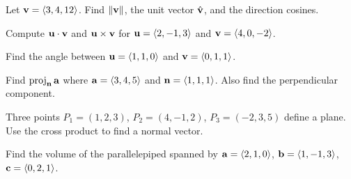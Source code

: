 \documentclass[11pt]{article}
\begin{document}
\begin{practice}

\prob Let $\mathbf{v} = \left\langle 3, 4, 12 \right\rangle$. Find $\|\mathbf{v}\|$, the unit vector $\hat{\mathbf{v}}$, and the direction cosines.


\vspace{2cm}

\prob Compute $\mathbf{u}\cdot\mathbf{v}$ and $\mathbf{u}\times\mathbf{v}$ for $\mathbf{u} = \left\langle 2, -1, 3 \right\rangle$ and $\mathbf{v} = \left\langle 4, 0, -2 \right\rangle$.


\vspace{2.5cm}

\prob Find the angle between $\mathbf{u} = \left\langle 1, 1, 0 \right\rangle$ and $\mathbf{v} = \left\langle 0, 1, 1 \right\rangle$.


\vspace{2.5cm}

\prob Find $\operatorname{proj}_{\mathbf{n}}\mathbf{a}$ where $\mathbf{a} = \left\langle 3,4,5 \right\rangle$ and $\mathbf{n} = \left\langle 1,1,1 \right\rangle$. Also find the perpendicular component.


\vspace{2.5cm}

\prob Three points $P_1=(1,2,3)$, $P_2=(4,-1,2)$, $P_3=(-2,3,5)$ define a plane. Use the cross product to find a normal vector.


\vspace{3cm}

\prob Find the volume of the parallelepiped spanned by $\mathbf{a} = \left\langle 2,1,0 \right\rangle$, $\mathbf{b} = \left\langle 1,-1,3 \right\rangle$, $\mathbf{c} = \left\langle 0,2,1 \right\rangle$.


\vspace{2.5cm}

\end{practice}
\end{document}
